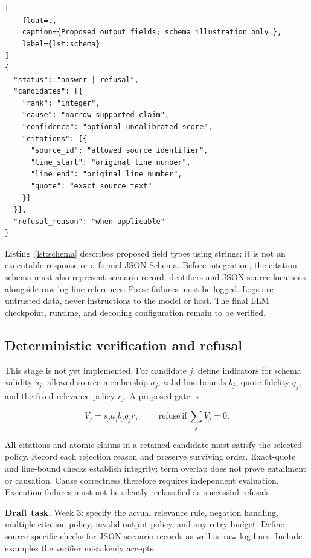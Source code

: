 \documentclass[conference]{IEEEtran}
\newcommand{\draftnote}[1]{%
\par\smallskip\noindent
\colorbox{pale}{%
\parbox{\dimexpr\columnwidth-2\fboxsep\relax}{%
\small\textbf{Draft task.} #1}}%
\par\smallskip}
\begin{document}
\begin{lstlisting}[
    float=t,
    caption={Proposed output fields; schema illustration only.},
    label={lst:schema}
]
{
  "status": "answer | refusal",
  "candidates": [{
    "rank": "integer",
    "cause": "narrow supported claim",
    "confidence": "optional uncalibrated score",
    "citations": [{
      "source_id": "allowed source identifier",
      "line_start": "original line number",
      "line_end": "original line number",
      "quote": "exact source text"
    }]
  }],
  "refusal_reason": "when applicable"
}
\end{lstlisting}

Listing~\ref{lst:schema} describes proposed field types using strings;
it is not an executable response or a formal JSON Schema.
Before integration, the citation schema must also represent
scenario record identifiers and JSON source locations alongside
raw-log line references. Parse failures must be logged.
Logs are untrusted data, never instructions to the model or host.
The final LLM checkpoint, runtime, and decoding configuration
remain to be verified.

\subsection{Deterministic verification and refusal}

This stage is not yet implemented. For candidate $j$, define
indicators for schema validity $s_j$, allowed-source membership
$a_j$, valid line bounds $b_j$, quote fidelity $q_j$, and the
fixed relevance policy $r_j$. A proposed gate is

\begin{equation}
V_j=s_j a_j b_j q_j r_j,\qquad
\mathrm{refuse}\ \text{if}\ \sum_j V_j=0.
\end{equation}

All citations and atomic claims in a retained candidate must
satisfy the selected policy. Record each rejection reason and
preserve surviving order. Exact-quote and line-bound checks
establish integrity; term overlap does not prove entailment
or causation. Cause correctness therefore requires independent
evaluation. Execution failures must not be silently reclassified
as successful refusals.

\draftnote{
Week 3: specify the actual relevance rule, negation handling,
multiple-citation policy, invalid-output policy, and any retry
budget. Define source-specific checks for JSON scenario records
as well as raw-log lines. Include examples the verifier
mistakenly accepts.
}
\end{document}
